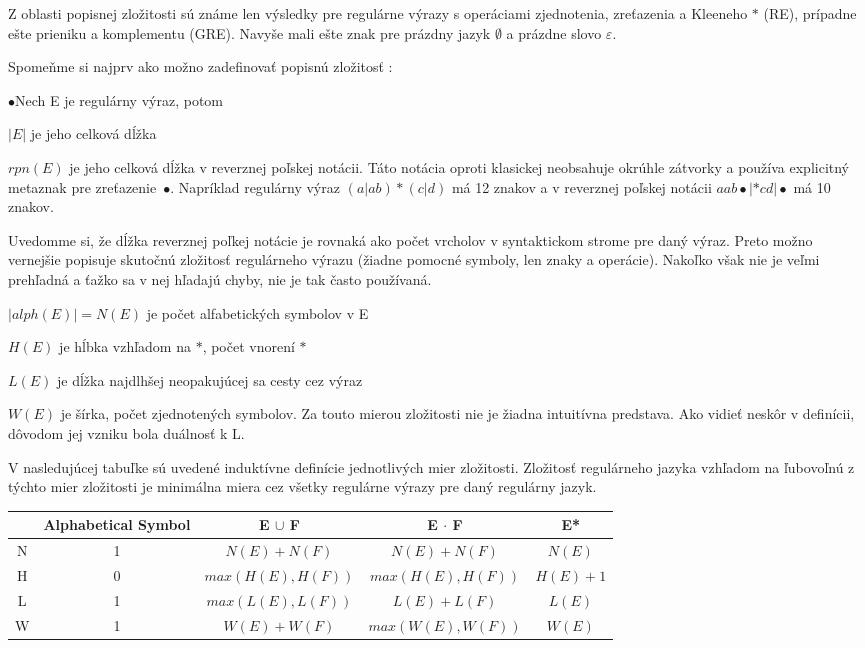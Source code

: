 Z oblasti popisnej zložitosti sú známe len výsledky pre regulárne výrazy s operáciami zjednotenia, zreťazenia a Kleeneho $*$ (RE), prípadne ešte prieniku a komplementu (GRE). Navyše mali ešte znak pre prázdny jazyk $\emptyset$ a prázdne slovo $\varepsilon$.

Spomeňme si najprv ako možno zadefinovať popisnú zložitosť \cite{newResults} \cite{compMeasures75}:

\begin{list}{$\bullet$}{Nech E je regulárny výraz, potom}
\item $|E|$ je jeho celková dĺžka
\item $rpn(E)$ je jeho celková dĺžka v reverznej poľskej notácii. Táto notácia oproti klasickej neobsahuje okrúhle zátvorky a používa explicitný metaznak pre zreťazenie~$\bullet$. Napríklad regulárny výraz $(a|ab)*(c|d)$ má 12 znakov a v reverznej poľskej notácii $aab\bullet |*cd|\bullet$ má 10 znakov.

Uvedomme si, že dĺžka reverznej poľkej notácie je rovnaká ako počet vrcholov v syntaktickom strome pre daný výraz. Preto možno vernejšie popisuje skutočnú zložitosť regulárneho výrazu (žiadne pomocné symboly, len znaky a operácie). Nakoľko však nie je veľmi prehľadná a ťažko sa v nej hľadajú chyby, nie je tak často používaná.
\item $|alph(E)|= N(E)$ je počet alfabetických symbolov v E
\item $H(E)$ je hĺbka vzhľadom na $*$, počet vnorení $*$
\item $L(E)$ je dĺžka najdlhšej neopakujúcej sa cesty cez výraz
\item $W(E)$ je šírka, počet zjednotených symbolov. Za touto mierou zložitosti nie je žiadna intuitívna predstava. Ako vidieť neskôr v definícii, dôvodom jej vzniku bola duálnosť k L.
\end{list}

V nasledujúcej tabuľke sú uvedené induktívne definície jednotlivých mier zložitosti. Zložitosť regulárneho jazyka vzhľadom na ľubovoľnú z týchto mier zložitosti je minimálna miera cez všetky regulárne výrazy pre daný regulárny jazyk.
\begin{center}

\begin{tabular}{|c||c|c|c|c|}
\hline
 ~ & Alphabetical Symbol & E $\cup$ F & E $\cdot$ F & E*
\\ \hline\hline
N & 1 & $N(E)+N(F)$ & $N(E)+N(F)$ & $N(E)$
\\ \hline 
H & 0 & $max(H(E),H(F))$ & $max(H(E),H(F))$ & $H(E)+1$
\\ \hline
L & 1 & $max(L(E),L(F))$ & $L(E)+L(F)$ & $L(E)$
\\ \hline
W & 1 & $W(E)+W(F)$ & $max(W(E),W(F))$ & $W(E)$
\\ \hline
\end{tabular}
\end{center}

